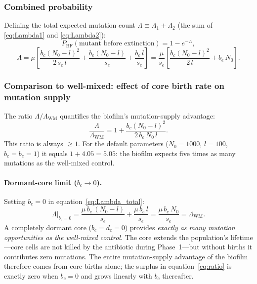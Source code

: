 \documentclass[12pt]{article}
\newcommand{\Nzero}{N_0}
\newcommand{\sEdge}{s_e}
\newcommand{\bEdge}{b_e}
\newcommand{\bCore}{b_c}
\newcommand{\dCore}{d_c}
\begin{document}
\subsubsection*{Combined probability}

Defining the total expected mutation count
$\Lambda \equiv \Lambda_1 + \Lambda_2$ (the sum of
\eqref{eq:Lambda1} and \eqref{eq:Lambda2}):
\begin{equation}
    \boxed{P_{\text{BF}}(\text{mutant before extinction})
    = 1 - e^{-\Lambda},}
    \label{eq:p_bf}
\end{equation}
\begin{equation}
    \Lambda = \mu\left[
        \frac{\bCore(\Nzero - l)^2}{2\,\sEdge\, l}
        + \frac{\bEdge(\Nzero - l)}{\sEdge}
        + \frac{\bEdge\, l}{\sEdge}
    \right]
    = \frac{\mu}{\sEdge}\left[
        \frac{\bCore(\Nzero - l)^2}{2\,l}
        + \bEdge\, \Nzero
    \right].
    \label{eq:Lambda_total}
\end{equation}

\subsubsection*{Comparison to well-mixed: effect of core birth rate on mutation supply}

The ratio $\Lambda / \Lambda_{\text{WM}}$ quantifies the biofilm's
mutation-supply advantage:
\begin{equation}
    \frac{\Lambda}{\Lambda_{\text{WM}}}
    = 1 + \frac{\bCore(\Nzero - l)^2}{2\, \bEdge\, \Nzero\, l}.
    \label{eq:ratio}
\end{equation}
This ratio is always $\geq 1$. For the default parameters ($\Nzero = 1000$,
$l = 100$, $\bCore = \bEdge = 1$) it equals $1 + 4.05 = 5.05$: the biofilm
expects five times as many mutations as the well-mixed control.

\paragraph{Dormant-core limit ($\bCore \to 0$).}
Setting $\bCore = 0$ in equation~\eqref{eq:Lambda_total}:
\begin{equation}
    \Lambda\big|_{\bCore=0}
    = \frac{\mu\,\bEdge\,(\Nzero - l)}{\sEdge}
      + \frac{\mu\,\bEdge\,l}{\sEdge}
    = \frac{\mu\,\bEdge\,\Nzero}{\sEdge}
    = \Lambda_{\text{WM}}.
    \label{eq:dormant_limit}
\end{equation}
A completely dormant core ($\bCore = \dCore = 0$) provides \emph{exactly as
many mutation opportunities as the well-mixed control.} The core extends the
population's lifetime---core cells are not killed by the antibiotic during
Phase~1---but without births it contributes zero mutations. The entire
mutation-supply advantage of the biofilm therefore comes from core births
alone; the surplus in equation~\eqref{eq:ratio} is exactly zero when
$\bCore = 0$ and grows linearly with $\bCore$ thereafter.
\end{document}
